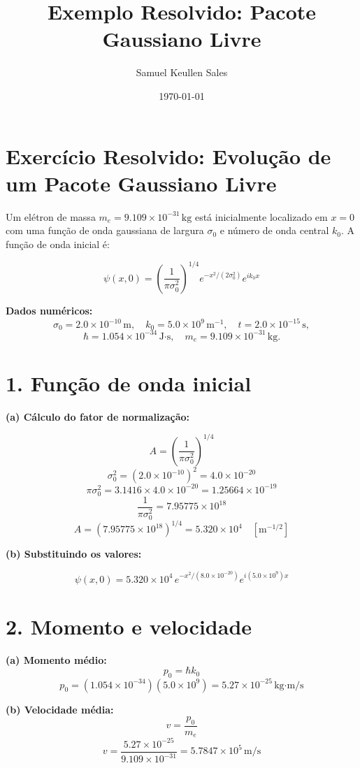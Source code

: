 \documentclass[a4paper,12pt]{article}
\title{Exemplo Resolvido: Pacote Gaussiano Livre}
\author{Samuel Keullen Sales}
\date{\today}
\begin{document}
\maketitle

\section*{Exercício Resolvido: Evolução de um Pacote Gaussiano Livre}

Um elétron de massa $m_e = 9.109\times10^{-31}\,\text{kg}$ está inicialmente localizado em $x=0$ com uma função de onda gaussiana de largura $\sigma_0$ e número de onda central $k_0$.  
A função de onda inicial é:

\[
\psi(x,0) = \left(\frac{1}{\pi \sigma_0^2}\right)^{1/4} e^{-x^2/(2\sigma_0^2)} e^{i k_0 x}
\]

\textbf{Dados numéricos:}
\[
\sigma_0 = 2.0\times10^{-10}\,\text{m}, \quad
k_0 = 5.0\times10^9\,\text{m}^{-1}, \quad
t = 2.0\times10^{-15}\,\text{s}, 
\]
\[
\hbar = 1.054\times10^{-34}\,\text{J·s}, \quad
m_e = 9.109\times10^{-31}\,\text{kg}.
\]

\section*{1. Função de onda inicial}

\textbf{(a) Cálculo do fator de normalização:}

\[
A = \left(\frac{1}{\pi\sigma_0^2}\right)^{1/4}
\]
\[
\sigma_0^2 = (2.0\times10^{-10})^2 = 4.0\times10^{-20}
\]
\[
\pi\sigma_0^2 = 3.1416 \times 4.0\times10^{-20} = 1.25664\times10^{-19}
\]
\[
\frac{1}{\pi\sigma_0^2} = 7.95775\times10^{18}
\]
\[
A = (7.95775\times10^{18})^{1/4} = 5.320\times10^4 \quad [\text{m}^{-1/2}]
\]

\textbf{(b) Substituindo os valores:}

\[
\psi(x,0) = 5.320\times10^4 \, e^{-x^2/(8.0\times10^{-20})} e^{i(5.0\times10^9)x}
\]

\section*{2. Momento e velocidade}

\textbf{(a) Momento médio:}
\[
p_0 = \hbar k_0
\]
\[
p_0 = (1.054\times10^{-34})(5.0\times10^9) = 5.27\times10^{-25}\, \text{kg·m/s}
\]

\textbf{(b) Velocidade média:}
\[
v = \frac{p_0}{m_e}
\]
\[
v = \frac{5.27\times10^{-25}}{9.109\times10^{-31}} = 5.7847\times10^5\, \text{m/s}
\]
\end{document}
